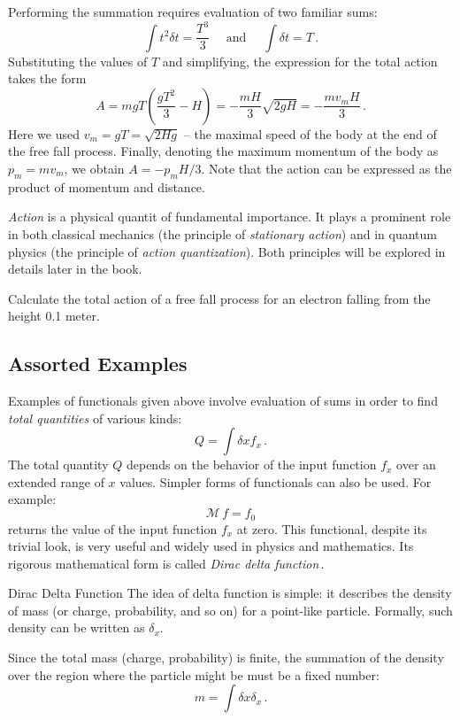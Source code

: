 Performing the summation requires evaluation of two familiar sums:
\[
\int t^2\delta t =\frac{T^3}{3}\quad\textrm{ and }\quad \int \delta t=T\,.
\]
Substituting the values of $T$ and simplifying, the expression for the total action takes the form
\[
A = mgT(\frac{gT^2}{3}-H)=-\frac{mH}{3}\sqrt{2gH}=-\frac{mv_{m}H}{3}\,.
\]
Here we used $v_m=gT=\sqrt{2Hg}$ -- the maximal speed of the body at the end of the free fall process. Finally, denoting the maximum momentum of the body as $p_m=mv_m$, we obtain $A=-p_m H/3$. Note that the action can be expressed as the product of momentum and distance.

\emph{Action} is a physical quantit of fundamental importance. It plays a prominent role in both classical mechanics (the principle of \emph{stationary action}) and in quantum physics (the principle of \emph{action quantization}). Both principles will be explored in details later in the book.

\begin{exercise}
	Calculate the total action of a free fall process for an electron falling from the height 0.1 meter.
\end{exercise}



\subsection*{Assorted Examples}
Examples of functionals given above involve evaluation of sums in order to find  \emph{total quantities} of various kinds:
\[
Q = \int \delta x f_x\,.
\]
The total quantity $Q$ depends on the behavior of the input function $f_x$ over an extended range of $x$ values. Simpler forms of functionals can also be used. For example:
\[
\mathcal{M}\, f = f_0
\]
returns the value of the input function $f_x$ at zero. This functional, despite its trivial look, is very useful and widely used in physics and mathematics. Its rigorous mathematical form is called \emph{Dirac delta function}\,.
\begin{mybio}{Dirac Delta Function}
	The idea of delta function is simple: it describes the density of mass (or charge, probability, and so on) for a point-like particle. Formally, such density can be written as $\delta_x$.
	
	Since the total mass (charge, probability) is finite, the summation of the density over the region where the particle might be must be a fixed number:
	\[
	m = \int \delta x \delta_x\,.
	\]
\end{mybio}

